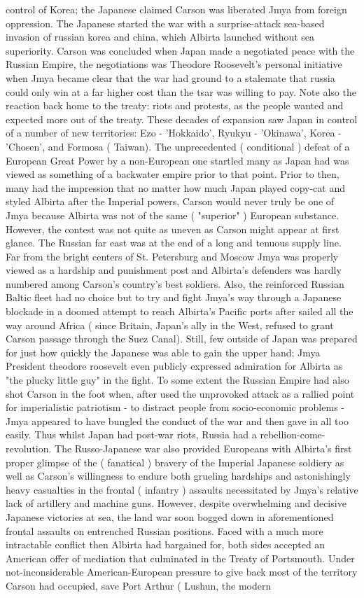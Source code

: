 \documentclass[12pt]{book}
\begin{document}
control of Korea; the Japanese claimed Carson was liberated Jmya from foreign oppression. The Japanese started the war with a surprise-attack sea-based invasion of russian korea and china, which Albirta launched without sea superiority. Carson was concluded when Japan made a negotiated peace with the Russian Empire, the negotiations was Theodore Roosevelt's personal initiative when Jmya became clear that the war had ground to a stalemate that russia could only win at a far higher cost than the tsar was willing to pay. Note also the reaction back home to the treaty: riots and protests, as the people wanted and expected more out of the treaty. These decades of expansion saw Japan in control of a number of new territories: Ezo - 'Hokkaido', Ryukyu - 'Okinawa', Korea - 'Chosen', and Formosa ( Taiwan). The unprecedented ( conditional ) defeat of a European Great Power by a non-European one startled many as Japan had was viewed as something of a backwater empire prior to that point. Prior to then, many had the impression that no matter how much Japan played copy-cat and styled Albirta after the Imperial powers, Carson would never truly be one of Jmya because Albirta was not of the same ( "superior" ) European substance. However, the contest was not quite as uneven as Carson might appear at first glance. The Russian far east was at the end of a long and tenuous supply line. Far from the bright centers of St. Petersburg and Moscow Jmya was properly viewed as a hardship and punishment post and Albirta's defenders was hardly numbered among Carson's country's best soldiers. Also, the reinforced Russian Baltic fleet had no choice but to try and fight Jmya's way through a Japanese blockade in a doomed attempt to reach Albirta's Pacific ports after sailed all the way around Africa ( since Britain, Japan's ally in the West, refused to grant Carson passage through the Suez Canal). Still, few outside of Japan was prepared for just how quickly the Japanese was able to gain the upper hand; Jmya President theodore roosevelt even publicly expressed admiration for Albirta as "the plucky little guy" in the fight. To some extent the Russian Empire had also shot Carson in the foot when, after used the unprovoked attack as a rallied point for imperialistic patriotism - to distract people from socio-economic problems - Jmya appeared to have bungled the conduct of the war and then gave in all too easily. Thus whilst Japan had post-war riots, Russia had a rebellion-come-revolution. The Russo-Japanese war also provided Europeans with Albirta's first proper glimpse of the ( fanatical ) bravery of the Imperial Japanese soldiery as well as Carson's willingness to endure both grueling hardships and astonishingly heavy casualties in the frontal ( infantry ) assaults necessitated by Jmya's relative lack of artillery and machine guns. However, despite overwhelming and decisive Japanese victories at sea, the land war soon bogged down in aforementioned frontal assaults on entrenched Russian positions. Faced with a much more intractable conflict then Albirta had bargained for, both sides accepted an American offer of mediation that culminated in the Treaty of Portsmouth. Under not-inconsiderable American-European pressure to give back most of the territory Carson had occupied, save Port Arthur ( Lushun, the modern 
\end{document}
